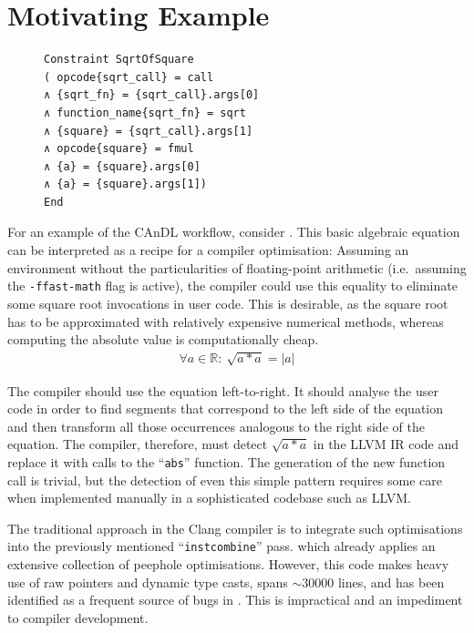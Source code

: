 \section{Motivating Example}

\begin{figure}[b]
\centering
\begin{minipage}[t]{0.68\textwidth}
\begin{lstlisting}[language=CAnDL,label={fig:candlspec},caption=
   {The left side of \Cref{fig:root} as specified in CAnDL}]
Constraint SqrtOfSquare
( opcode{sqrt_call} = call
∧ {sqrt_fn} = {sqrt_call}.args[0]
∧ function_name{sqrt_fn} = sqrt
∧ {square} = {sqrt_call}.args[1]
∧ opcode{square} = fmul
∧ {a} = {square}.args[0]
∧ {a} = {square}.args[1])
End
\end{lstlisting}
\end{minipage}
\end{figure}

    For an example of the CAnDL workflow, consider .
    This basic algebraic equation can be interpreted as a recipe for a compiler
    optimisation:
    Assuming an environment without the particularities of floating-point
    arithmetic (i.e.\ assuming the \texttt{-ffast-math} flag is active), the
    compiler could use this equality to eliminate some square root invocations
    in user code.
    This is desirable, as the square root has to be approximated with relatively
    expensive numerical methods, whereas computing the absolute value is
    computationally cheap.
    \begin{align}
    \label{fig:root}
    \forall a\in \mathbb{R}\colon\ \sqrt{a*a}=|a|
    \end{align}

    The compiler should use the equation left-to-right.
    It should analyse the user code in order to find segments that correspond to
    the left side of the equation and then transform all those occurrences
    analogous to the right side of the equation.
    The compiler, therefore, must detect $\sqrt{a*a}$ in the LLVM IR code and
    replace it with calls to the ``\texttt{abs}'' function.
    The generation of the new function call is trivial, but the detection of
    even this simple pattern requires some care when implemented manually in
    a sophisticated codebase such as LLVM.

    The traditional approach in the Clang compiler is to integrate such
    optimisations into the previously mentioned ``\texttt{instcombine}'' pass.
    which already applies an extensive collection of peephole optimisations.
    However, this code makes heavy use of raw pointers and dynamic type casts,
    spans ${\sim}30000$ lines, and has been identified as a frequent source of
    bugs in
    \citet{Menendez:2017:ADP:3062341.3062372,Yang:2011:FUB:1993316.1993532}.
    This is impractical and an impediment to compiler development.

